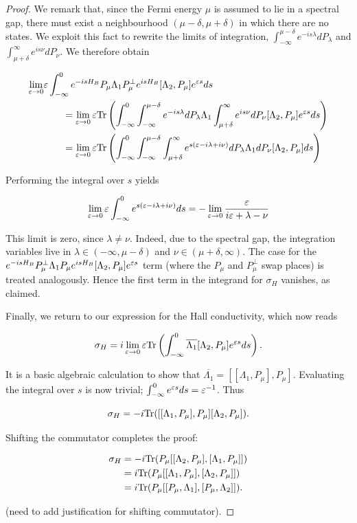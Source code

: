 \documentclass[12pt, letterpaper]{article}
\begin{document}
\begin{proof}
We remark that, since the Fermi energy $\mu$ is assumed to lie in a spectral gap, there must exist a neighbourhood $(\mu-\delta, \mu+\delta)$ in which there are no states. We exploit this fact to rewrite the limits of integration, $\int_{-\infty}^{\mu-\delta} e^{-is\lambda}dP_\lambda$ and $\int_{\mu+\delta}^\infty e^{is\nu} dP_\nu$. We therefore obtain

\[\begin{aligned} 
\lim_{\varepsilon\to 0} &\varepsilon \int_{-\infty}^0 e^{-isH_B}P_\mu \Lambda_1 P_\mu^\perp e^{isH_B}[\Lambda_2, P_\mu]e^{\varepsilon s} ds \\
&\quad\quad= \lim_{\varepsilon\to 0} \varepsilon \text{Tr}\left( \int_{-\infty}^0 \int_{-\infty}^{\mu-\delta} e^{-is\lambda}dP_\lambda \Lambda_1 \int_{\mu+\delta}^\infty e^{is\nu} dP_\nu [\Lambda_2, P_\mu] e^{\varepsilon s} ds\right)\\
&\quad\quad= \lim_{\varepsilon\to 0} \varepsilon \text{Tr}\left( \int_{-\infty}^0 \int_{-\infty}^{\mu-\delta} \int_{\mu+\delta}^\infty e^{s(\varepsilon-i\lambda+i\nu)}dP_\lambda \Lambda_1 dP_\nu [\Lambda_2, P_\mu]ds\right)\\
\end{aligned}\]

Performing the integral over $s$ yields

\[\lim_{\varepsilon\to 0}\varepsilon \int_{-\infty}^0 e^{s(\varepsilon-i\lambda+i\nu)}ds = -\lim_{\varepsilon\to 0} \frac{\varepsilon}{i\varepsilon + \lambda-\nu}\]

This limit is zero, since $\lambda \neq \nu$. Indeed, due to the spectral gap, the integration variables live in $\lambda \in (-\infty, \mu-\delta)$ and $\nu \in (\mu+\delta,\infty)$. The case for the $e^{-isH_B}P_\mu^\perp \Lambda_1 P_\mu e^{isH_B}[\Lambda_2, P_\mu]e^{\varepsilon s}$ term (where the $P_\mu$ and $P_\mu^\perp$ swap places) is treated analogously. Hence the first term in the integrand for $\sigma_H$ vanishes, as claimed. 

Finally, we return to our expression for the Hall conductivity, which now reads

\[\sigma_H = i\lim_{\varepsilon\to 0}\varepsilon \text{Tr}\left(\int_{-\infty}^0 \overline{\Lambda_1}[\Lambda_2, P_\mu]e^{\varepsilon s}ds\right).\]

It is a basic algebraic calculation to show that $\overline{\Lambda_1} = [[\Lambda_1, P_\mu],P_\mu]$. Evaluating the integral over $s$ is now trivial; $\int_{-\infty}^0 e^{\varepsilon s}ds = \varepsilon^{-1}$. Thus

\[\sigma_H = -i\text{Tr}([[\Lambda_1,P_\mu],P_\mu][\Lambda_2,P_\mu]).\]

Shifting the commutator completes the proof:

\[\begin{aligned}
\sigma_H &= -i\text{Tr}(P_\mu[[\Lambda_2,P_\mu],[\Lambda_1,P_\mu]]) \\
&= i\text{Tr}(P_\mu[[\Lambda_1,P_\mu],[\Lambda_2,P_\mu]])\\
&= i\text{Tr}(P_\mu[[P_\mu,\Lambda_1],[P_\mu,\Lambda_2]]).
\end{aligned}\]

(need to add justification for shifting commutator).
\end{proof}
\end{document}
